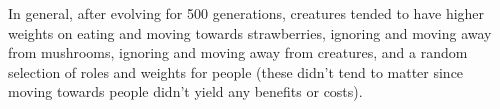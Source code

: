 \documentclass{article}
\begin{document}
In general, after evolving for 500 generations, creatures tended to have higher weights on eating and moving towards strawberries, ignoring and moving away from mushrooms, ignoring and moving away from creatures, and a random selection of roles and weights for people (these didn't tend to matter since moving towards people didn't yield any benefits or costs).  
\end{document}
